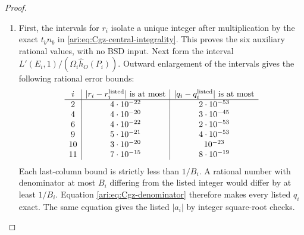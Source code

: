 \begin{proof}
\begin{enumerate}[label=\arabic*.,leftmargin=*]
\item First, the intervals for
$r_i$ isolate a unique integer after multiplication by the exact
$t_bn_b$ in \eqref{ari:eq:Cgz-central-integrality}. This proves the
six auxiliary rational values, with no BSD input. Next form the
interval $L'(E_i,1)/(\Omega_i\widehat h_O(P_i))$. Outward enlargement of the intervals gives the following rational
error bounds:
\[
\begin{array}{c|c|c}
 i&|r_i-r_i^{\rm listed}|\text{ is at most}
   &|q_i-q_i^{\rm listed}|\text{ is at most}\\\hline
 2&4\cdot10^{-22}&2\cdot10^{-53}\\
 4&4\cdot10^{-20}&3\cdot10^{-45}\\
 6&4\cdot10^{-22}&2\cdot10^{-53}\\
 9&5\cdot10^{-21}&4\cdot10^{-53}\\
 10&3\cdot10^{-20}&10^{-23}\\
 11&7\cdot10^{-15}&8\cdot10^{-19}
\end{array}
\]
Each last-column bound is strictly less than $1/B_i$. A rational
number with denominator at most $B_i$ differing from the listed
integer would differ by at least $1/B_i$. Equation
\eqref{ari:eq:Cgz-denominator} therefore makes every listed $q_i$
exact. The same equation gives the listed $|a_i|$ by integer
square-root checks. 
\end{enumerate}
\end{proof}